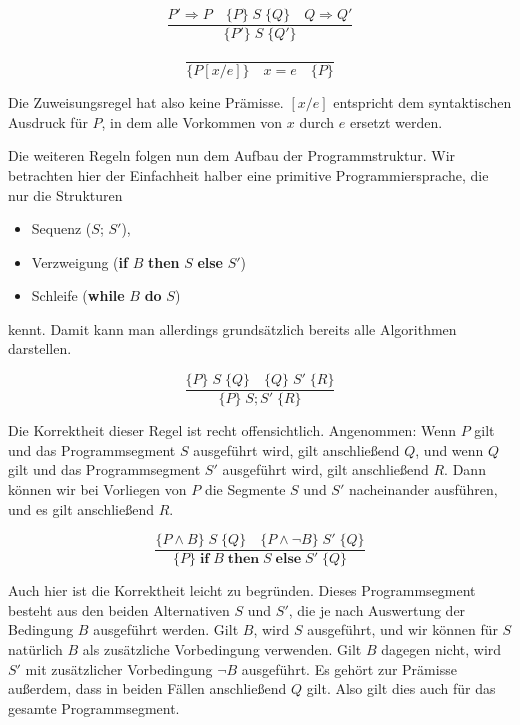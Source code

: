 
\vspace{2mm} %

$$\frac{P'\Rightarrow P \quad \{P\}\; S\; \{Q\}\quad Q \Rightarrow Q'}{\{P'\}\; S\; \{Q'\}}$$ 


$$\frac{}{\{P[x/e]\} \quad x = e \quad \{P\}}$$

Die Zuweisungsregel hat also keine Prämisse. $[x/e]$ entspricht dem syntaktischen Ausdruck für $P$, in dem alle Vorkommen von $x$ durch $e$ ersetzt werden.

Die weiteren Regeln folgen nun dem Aufbau der Programmstruktur. Wir betrachten hier der Einfachheit halber eine primitive Programmiersprache, die nur die \mbox{Strukturen}
\begin{itemize}
	\item Sequenz ($S$; $S'$),
	\item Verzweigung (\textbf{if} $B$ \textbf{then} $S$ \textbf{else} $S'$)
	\item Schleife (\textbf{while} $B$ \textbf{do} $S$)
\end{itemize}

kennt. Damit kann man allerdings grundsätzlich bereits alle Algorithmen darstellen.


\vspace{2mm} %


$$\frac{\{P\} \; S \; \{Q\} \quad \{Q\} \; S' \; \{R\}}{\{P\} \; S;S' \; \{R\}}$$

Die Korrektheit dieser Regel ist recht offensichtlich. Angenommen: Wenn $P$ gilt und das Programmsegment $S$ ausgeführt wird, gilt anschließend $Q$, und wenn $Q$ gilt und das Programmsegment $S'$ ausgeführt wird, gilt anschließend $R$. Dann können wir bei Vorliegen von $P$ die Segmente $S$ und $S'$ nacheinander ausführen, und es gilt anschließend $R$.


\vspace{2mm} %

$$\frac{\{P \wedge B\} \; S \; \{Q\} \quad \{P \wedge \neg B\} \; S' \; \{Q\}}{\{P\} \; \textbf{if} \; B \; \textbf{then} \; S \; \textbf{else} \; S' \; \{Q\}}$$

Auch hier ist die Korrektheit leicht zu begründen. Dieses Programmsegment besteht aus den beiden Alternativen $S$ und $S'$, die je nach Auswertung der Bedingung $B$ ausgeführt werden. Gilt $B$, wird $S$ ausgeführt, und wir können für $S$ natürlich $B$ als zusätzliche Vorbedingung verwenden. Gilt $B$ dagegen nicht, wird $S'$ mit zusätzlicher Vorbedingung $\neg B$ ausgeführt. Es gehört zur Prämisse außerdem, dass in beiden Fällen anschließend $Q$ gilt. Also gilt dies auch für das gesamte Programmsegment.

